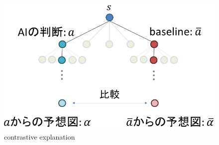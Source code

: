 \begin{figure}[t]
	\centering
	\includegraphics[width=\linewidth]{./figure/contrastive.png}
	\caption{contrastive explanation}
	\label{fig:contrastive}
\end{figure}

